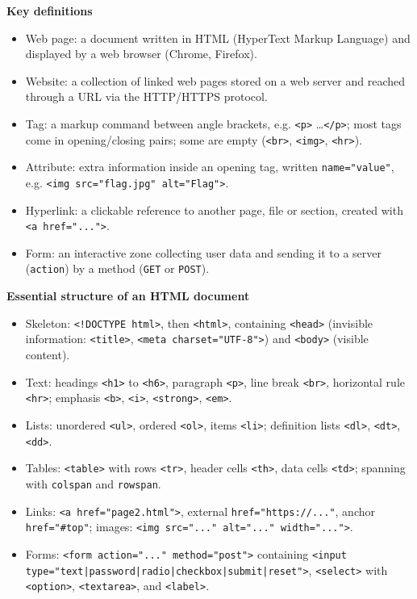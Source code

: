 \documentclass[11pt]{article}
\newcommand{\cle}[1]{{\popxbold\color{popdark}#1}}
\begin{document}
\begin{bilan}
\textbf{Key definitions}
\begin{itemize}
  \item \cle{Web page}: a document written in \cle{HTML} (HyperText Markup Language) and displayed by a \cle{web browser} (Chrome, Firefox).
  \item \cle{Website}: a collection of linked web pages stored on a \cle{web server} and reached through a \cle{URL} via the \cle{HTTP/HTTPS} protocol.
  \item \cle{Tag}: a markup command between angle brackets, e.g. \texttt{<p>} \dots \texttt{</p>}; most tags come in opening/closing pairs; some are empty (\texttt{<br>}, \texttt{<img>}, \texttt{<hr>}).
  \item \cle{Attribute}: extra information inside an opening tag, written \texttt{name="value"}, e.g. \texttt{<img src="flag.jpg" alt="Flag">}.
  \item \cle{Hyperlink}: a clickable reference to another page, file or section, created with \texttt{<a href="...">}.
  \item \cle{Form}: an interactive zone collecting user data and sending it to a server (\texttt{action}) by a method (\texttt{GET} or \texttt{POST}).
\end{itemize}

\textbf{Essential structure of an HTML document}
\begin{itemize}
  \item Skeleton: \texttt{<!DOCTYPE html>}, then \texttt{<html>}, containing \texttt{<head>} (invisible information: \texttt{<title>}, \texttt{<meta charset="UTF-8">}) and \texttt{<body>} (visible content).
  \item Text: headings \texttt{<h1>} to \texttt{<h6>}, paragraph \texttt{<p>}, line break \texttt{<br>}, horizontal rule \texttt{<hr>}; emphasis \texttt{<b>}, \texttt{<i>}, \texttt{<strong>}, \texttt{<em>}.
  \item Lists: unordered \texttt{<ul>}, ordered \texttt{<ol>}, items \texttt{<li>}; definition lists \texttt{<dl>}, \texttt{<dt>}, \texttt{<dd>}.
  \item Tables: \texttt{<table>} with rows \texttt{<tr>}, header cells \texttt{<th>}, data cells \texttt{<td>}; spanning with \texttt{colspan} and \texttt{rowspan}.
  \item Links: \texttt{<a href="page2.html">}, external \texttt{href="https://..."}, anchor \texttt{href="\#top"}; images: \texttt{<img src="..." alt="..." width="...">}.
  \item Forms: \texttt{<form action="..." method="post">} containing \texttt{<input type="text|password|radio|checkbox|submit|reset">}, \texttt{<select>} with \texttt{<option>}, \texttt{<textarea>}, and \texttt{<label>}.
\end{itemize}


\end{bilan}
\end{document}
